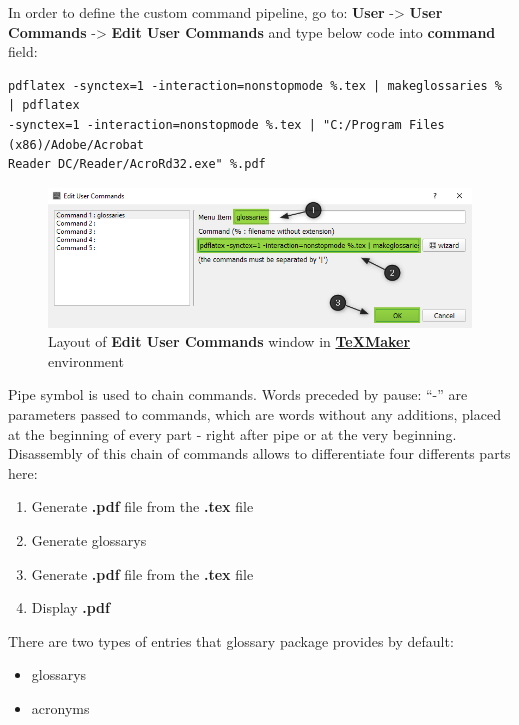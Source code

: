 In order to define the custom command \gls{pipeline}, go to: \textbf{User} -> \textbf{User Commands} -> \textbf{Edit User Commands} and type below code into \textbf{command} field:
\begin{verbatim}
pdflatex -synctex=1 -interaction=nonstopmode %.tex | makeglossaries % | pdflatex 
-synctex=1 -interaction=nonstopmode %.tex | "C:/Program Files (x86)/Adobe/Acrobat
Reader DC/Reader/AcroRd32.exe" %.pdf
\end{verbatim}

\begin{figure}[H]
\centering
\includegraphics[scale=0.6]{content/LaTeX/figures/custom_command_marked.png}
\caption{Layout of \textbf{Edit User Commands} window in \textbf{\href{https://www.xm1math.net/texmaker/}{TeXMaker}} environment}
\end{figure}

Pipe symbol is used to chain commands. Words preceded by pause: ``-'' are \glspl{parameter} passed to commands, which are words without any additions, placed at the beginning of every part - right after pipe or at the very beginning. Disassembly of this chain of commands allows to differentiate four differents parts here:
\begin{enumerate}
\item Generate \textbf{.pdf} file from the \textbf{.tex} file
\item Generate \glspl{glossary}
\item Generate \textbf{.pdf} file from the \textbf{.tex} file
\item Display \textbf{.pdf}
\end{enumerate}

There are two types of entries that \gls{glossary} package provides by default:
\begin{itemize}
\item \glspl{glossary}
\item acronyms
\end{itemize}

